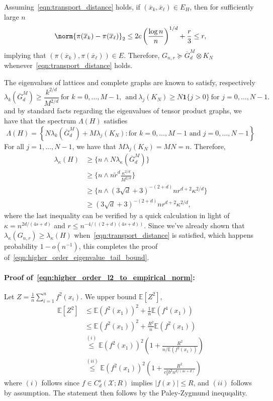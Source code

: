 \documentclass{article}
\newcommand{\abs}[1]{\left \lvert #1 \right \rvert}
\newcommand{\set}[1]{\left\{#1\right\}}
\newcommand{\1}{\mathbf{1}}
\newcommand{\Xset}{\mathcal{X}}
\newcommand{\Ebb}{\mathbb{E}}
\newcommand{\wt}[1]{\widetilde{#1}}
\newcommand{\ol}[1]{\overline{#1}}
\theoremstyle{alden}
\theoremstyle{aldenthm}
\theoremstyle{definition}
\theoremstyle{remark}
\begin{document}
Assuming~\eqref{eqn:transport_distance} holds, if $(\ol{x}_k, \ol{x}_{\ell}) \in E_H$, then for sufficiently large $n$
\begin{equation*}
\norm{\pi(\ol{x}_k) - \pi(\ol{x}_\ell)}_2 \leq 2 c \left(\frac{\log n}{n}\right)^{1/d} + \frac{r}{3} \leq r,
\end{equation*}
implying that $(\pi(\ol{x}_k), \pi(\ol{x}_{\ell})) \in E$. Therefore, $G_{n,r} \succeq \ol{G}^M_d \otimes K_N$ whenever~\eqref{eqn:transport_distance} holds.

The eigenvalues of lattices and complete graphs are known to satisfy, respectively
\begin{equation*}
\lambda_k(\ol{G}^{M}_d) \geq \frac{k^{2/d}}{M^{2/d}}~\textrm{for $k = 0,\ldots,M - 1$},~~ \textrm{and}~\lambda_{j}(K_N) \geq N\1\{j > 0\}~\textrm{for $j = 0,\ldots,N-1$.}
\end{equation*}
and by standard facts regarding the eigenvalues of tensor product graphs, we have that the spectrum $\Lambda(H)$ satisfies
\begin{equation*}
\Lambda(H) = \set{N\lambda_k(\ol{G}^{M}_d) + M\lambda_j(K_N): \textrm{for $k = 0,\ldots,M - 1$ and $j = 0,\ldots,N-1$}}
\end{equation*}
For all $j = 1,\ldots,N-1$, we have that $M\lambda_j(K_N) = MN = n$. Therefore,
\begin{align*}
\lambda_{\kappa}(H) & \geq \{n \wedge N\lambda_{\kappa}(\ol{G}^{M}_d)\} \\
& \geq \{n \wedge n\wt{r}^d\frac{\kappa^{2/d}}{M^{2/d}}\} \\
& \geq \{n \wedge (3\sqrt{d} + 3)^{-(2+d)}nr^{d+2}\kappa^{2/d}\} \\
& \geq (3\sqrt{d} + 3)^{-(2+d)}nr^{d+2}\kappa^{2/d},
\end{align*}
where the last inequality can be verified by a quick calculation in light of $\kappa = n^{2d/(4s + d)}$ and $r \leq n^{-4/((2+d)(4s + d))}$. Since we've already shown that $\lambda_{\kappa}(G_{n,r}) \geq \lambda_{\kappa}(H)$ when~\eqref{eqn:transport_distance} is satisfied, which happens probability $1 - o(n^{-1})$, this completes the proof of~\eqref{eqn:higher_order_eigenvalue_tail_bound}.

\paragraph{Proof of~\eqref{eqn:higher_order_l2_to_empirical_norm}:}

Let $Z = \frac{1}{n}\sum_{i = 1}^{n} f^2(x_i)$. We upper bound $\Ebb[Z^2]$,
\begin{align*}
\Ebb[Z^2] & \leq \Ebb(f^2(x_1))^2 + \frac{1}{n}\Ebb(f^4(x_1)) \\
& \leq \Ebb(f^2(x_1))^2 + \frac{R^2}{n}\Ebb(f^2(x_1)) \\
& \overset{(i)}{\leq} \Ebb(f^2(x_1))^2\left(1 + \frac{R^2}{n/\Ebb(f^2(x_1))}\right) \\
& \overset{(ii)}{\leq} \Ebb(f^2(x_1))^2\left(1 + \frac{R^2}{c_3^2 b^2 n^{d/(4s + d)}}\right)
\end{align*}
where $(i)$ follows since $f \in C_d^s(\Xset;R)$ implies $\abs{f(x)} \leq R$, and $(ii)$ follows by assumption. The statement then follows by the Paley-Zygmund inequqality.
\end{document}
